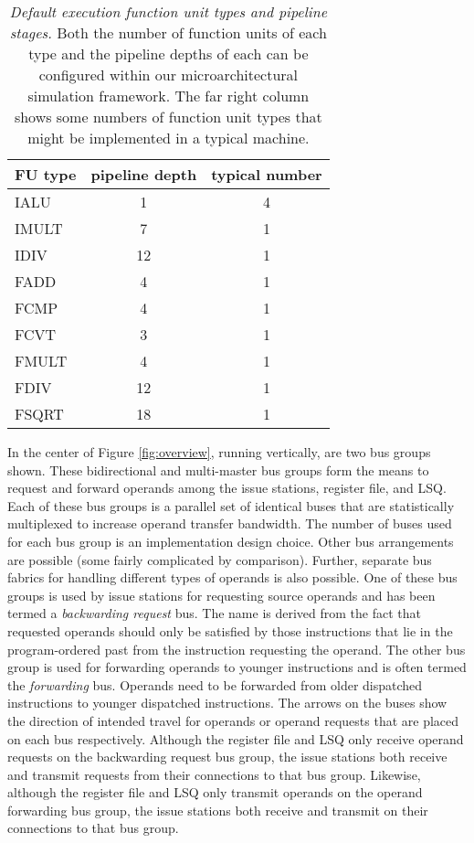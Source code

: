 \documentclass[10pt,dvips]{article}
\begin{document}
\begin{table}[p]
\begin{center}
\caption{{\em Default execution function unit types and pipeline stages.}
Both the number of function units of each type and the pipeline depths 
of each
can be configured within our microarchitectural simulation framework.
The far right column shows some numbers of function unit
types that might be implemented in a typical machine.}
\label{tab:futypes}
\vspace{+0.1in}
\scriptsize{
\begin{tabular}{|l|c|c|}
\hline 
FU type&pipeline depth&typical number\\
\hline
IALU&1&4\\
\hline
IMULT&7&1\\
\hline
IDIV&12&1\\
\hline
FADD&4&1\\
\hline
FCMP&4&1\\
\hline
FCVT&3&1\\
\hline
FMULT&4&1\\
\hline
FDIV&12&1\\
\hline
FSQRT&18&1\\
\hline
\end{tabular}
}
\end{center}
\end{table}
%
%

In the center of Figure \ref{fig:overview},
running vertically, are two bus groups shown.
These bidirectional and multi-master bus groups
form the means to request and forward operands
among the issue stations, register file, and LSQ.
Each of these bus groups is a parallel set of identical buses
that are statistically multiplexed to increase operand transfer
bandwidth.  The number of buses used for each bus group is
an implementation design choice.
Other bus arrangements are possible (some fairly complicated by
comparison).  
Further, separate bus fabrics for handling
different types of operands is also possible.
One of these bus groups is used by issue stations
for requesting source operands and
has been termed a \textit{backwarding request} bus.
The name is derived from the fact that requested operands should
only be satisfied by those instructions that lie in the program-ordered
past from the instruction requesting the operand.
The other bus group is used for forwarding operands to younger instructions
and is often termed the \textit{forwarding} bus.
Operands need to be forwarded from older dispatched
instructions to younger dispatched instructions.
The arrows on the buses show the direction of intended travel
for operands or operand requests that are placed on each bus
respectively.  Although the register file and LSQ only receive
operand requests on the backwarding request bus group, the issue stations
both receive and transmit requests from their connections to that
bus group.  Likewise, although the register file and LSQ only transmit
operands on the operand forwarding bus group, the issue stations
both receive and transmit on their connections to that bus group.
\end{document}
